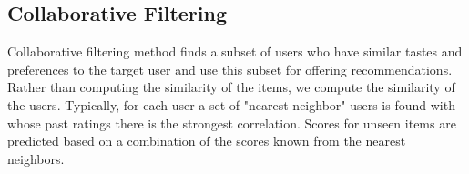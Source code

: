 \subsection{Collaborative Filtering}
Collaborative filtering method finds a subset of users who have similar tastes and preferences to the target user and use this subset for offering recommendations. Rather than computing the similarity of the items, we compute the similarity of the users. Typically, for each user a set of "nearest neighbor" users is found with whose past ratings there is the strongest correlation. Scores for unseen items are predicted based on a combination of the scores known from the nearest neighbors.
